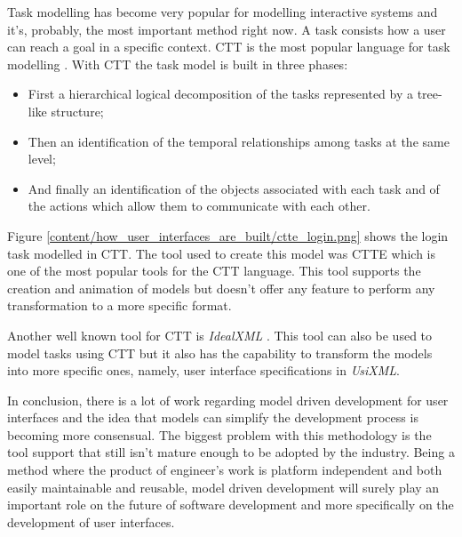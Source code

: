 Task modelling has become very popular for modelling interactive systems and it's, probably, the most important method right now. A task consists how a user can reach a goal in a specific context. CTT is the most popular language for task modelling \cite{ConcurTaskTrees_A_Diagrammatic_Notation_for_Specifying_Task_Models}. With CTT the task model is built in three phases:
\begin{itemize}
\item First a hierarchical logical decomposition of the tasks represented by a tree-like structure;
\item Then an identification of the temporal relationships among tasks at the same level;
\item And finally an identification of the objects associated with each task and of the actions which allow them to communicate with each other.
\end{itemize} 

Figure \ref{content/how_user_interfaces_are_built/ctte_login.png} shows the login task modelled in CTT. The tool used to create this model was CTTE \cite{ConcurTaskTrees_Environment} which is one of the most popular tools for the CTT language. This tool supports the creation and animation of models but doesn’t offer any feature to perform any transformation to a more specific format.

Another well known tool for CTT is \textit{IdealXML} \cite{IdealXml_An_Interaction_Design_Tool}. This tool can also be used to model tasks using CTT but it also has the capability to transform the models into more specific ones, namely, user interface specifications in \textit{UsiXML}.

In conclusion, there is a lot of work regarding model driven development for user interfaces and the idea that models can simplify the development process is becoming more consensual. The biggest problem with this methodology is the tool support that still isn't mature enough to be adopted by the industry. Being a method where the product of engineer's work is platform independent and both easily maintainable and reusable, model driven development will surely play an important role on the future of software development and more specifically on the development of user interfaces.
